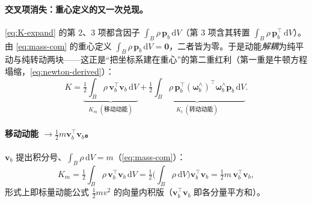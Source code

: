 \paragraph{交叉项消失：重心定义的又一次兑现。}
\cref{eq:K-expand} 的第 2、3 项都含因子 $\int_B\rho\,\boldsymbol{p}_b\,\mathrm{d}V$（第 3 项含其转置 $\int_B\rho\,\boldsymbol{p}_b^\top\,\mathrm{d}V$）。由 \cref{eq:mass-com} 的重心定义 $\int_B\rho\,\boldsymbol{p}_b\,\mathrm{d}V=\mathbf{0}$，二者皆为零\cite{unitree2023quadruped}。于是动能\emph{解耦}为纯平动与纯转动两块——这正是“把坐标系建在重心”的第二重红利（第一重是牛顿方程塌缩，\cref{eq:newton-derived}）：
\begin{equation}
  K=\underbrace{\tfrac12\int_B\rho\,\boldsymbol{v}_b^\top\boldsymbol{v}_b\,\mathrm{d}V}_{K_m\ (\text{移动动能})}
  +\underbrace{\tfrac12\int_B\rho\,\boldsymbol{p}_b^\top(\boldsymbol{\omega}_b^\wedge)^\top\boldsymbol{\omega}_b^\wedge\boldsymbol{p}_b\,\mathrm{d}V}_{K_t\ (\text{转动动能})}.
  \label{eq:K-split}
\end{equation}

\paragraph{移动动能 $\to\tfrac12 m\boldsymbol{v}_b^\top\boldsymbol{v}_b$。}
$\boldsymbol{v}_b$ 提出积分号、$\int_B\rho\,\mathrm{d}V=m$（\cref{eq:mass-com}）\cite{unitree2023quadruped}：
\begin{equation}
  K_m=\tfrac12\int_B\rho\,\boldsymbol{v}_b^\top\boldsymbol{v}_b\,\mathrm{d}V
  =\tfrac12\Big(\int_B\rho\,\mathrm{d}V\Big)\boldsymbol{v}_b^\top\boldsymbol{v}_b
  =\tfrac12 m\,\boldsymbol{v}_b^\top\boldsymbol{v}_b,
  \label{eq:Km}
\end{equation}
形式上即标量动能公式 $\tfrac12 m v^2$ 的向量内积版（$\boldsymbol{v}_b^\top\boldsymbol{v}_b$ 即各分量平方和）。

